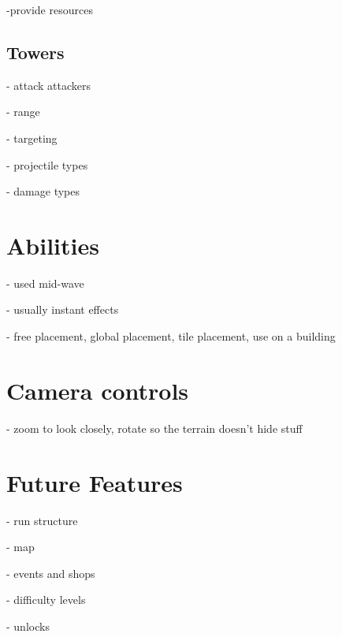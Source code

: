 -provide resources

\subsection{Towers}

- attack attackers

- range

- targeting

- projectile types

- damage types

\section{Abilities}

- used mid-wave

- usually instant effects

- free placement, global placement, tile placement, use on a building

\section{Camera controls}

- zoom to look closely, rotate so the terrain doesn't hide stuff

\section{Future Features}

- run structure

- map

- events and shops

- difficulty levels

- unlocks
